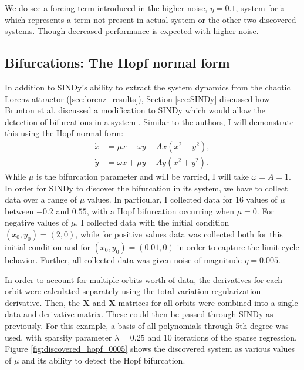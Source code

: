 \documentclass[10pt]{paper}
\begin{document}
We do see a forcing term introduced in the higher noise, $\eta = 0.1$, system for $\dot z$ which represents a term not present in actual system or the other two discovered systems. Though decreased performance is expected with higher noise. 

\subsection{Bifurcations: The Hopf normal form}
In addition to SINDy's ability to extract the system dynamics from the chaotic Lorenz attractor (\ref{sec:lorenz_results}), Section \ref{sec:SINDy} discussed how Brunton et al. discussed a modification to SINDy which would allow the detection of bifurcations in a system \cite{sindy}. 
Similar to the authors, I will demonstrate this using the Hopf normal form:
\begin{equation} \label{eq:hopf_normal}
	\begin{split}
		\dot x &= \mu x - \omega y - Ax(x^2 + y^2), \\
		\dot y &= \omega x +\mu y - Ay(x^2 + y^2).
	\end{split}
\end{equation} 
While $\mu$ is the bifurcation parameter and will be varried, I will take $\omega = A = 1$. In order for SINDy to discover the bifurcation in its system, we have to collect data over a range of $\mu$ values. 
In particular, I collected data for 16 values of $\mu$ between $-0.2$ and $0.55$, with a Hopf bifurcation occurring when $\mu = 0$. For negative values of $\mu$, I collected data with the initial condition $(x_0,y_0) = (2,0)$, while for positive values data was collected both for this initial condition and for $(x_0, y_0) = (0.01, 0)$ in order to capture the limit cycle behavior. 
Further, all collected data was given noise of magnitude $\eta = 0.005$. 

In order to account for multiple orbits worth of data, the derivatives for each orbit were calculated separately using the total-variation regularization derivative. Then, the $\mathbf X$ and $\mathbf {\dot X}$ matrices for all orbits were combined into a single data and derivative matrix. 
These could then be passed through SINDy as previously. For this example, a basis of all polynomials through 5th degree was used, with sparsity parameter $\lambda = 0.25$ and $10$ iterations of the sparse regression. Figure \ref{fig:discovered_hopf_0005} shows the discovered system as various values of $\mu$ and its ability to detect the Hopf bifurcation. 
\end{document}
